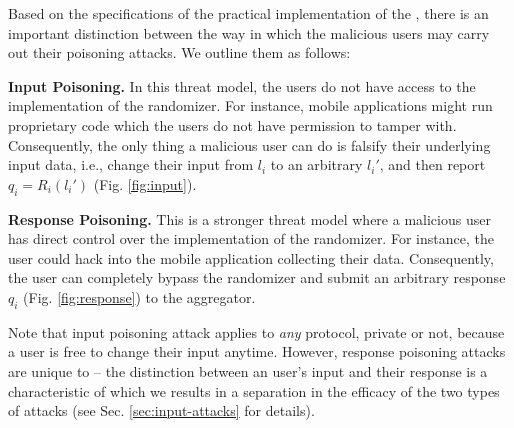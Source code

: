 Based on the specifications of the practical implementation of the \ldp, there is an important distinction between the way in which the malicious users may carry out their poisoning attacks. We outline them as follows:

\squishlist
    \item \textbf{Input Poisoning.} In this threat model, the users do not have access to the implementation of the \ldp{} randomizer. For instance, mobile applications might run proprietary code which the users do not have permission to tamper with. Consequently, the only thing a malicious user can do is falsify their underlying input data, i.e.,  change their input from $l_i$ to an arbitrary $l_i'$, and then report $q_i = R_i(l_i')$ (Fig. \ref{fig:input}).
    
    \item \textbf{Response Poisoning.} This is a stronger threat model where a malicious user has direct control over the implementation of the \ldp{} randomizer. For instance, the user could hack into the mobile application collecting their data. Consequently, the user can completely bypass the randomizer and submit an arbitrary response $q_{i}$ (Fig. \ref{fig:response}) to the aggregator.
\squishend

Note that input poisoning attack applies to \textit{any} protocol, private or not, because a user is free to change their input anytime. However, response poisoning attacks are unique to \ldp{} -- the distinction between an user's input and their response is a characteristic of \ldp{} which we results in a separation in the efficacy of the two types of attacks (see Sec. \ref{sec:input-attacks} for details). 


